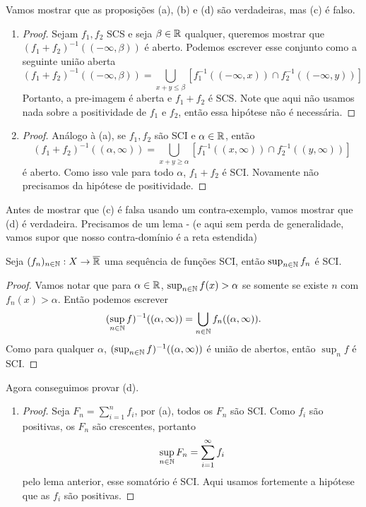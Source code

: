 Vamos mostrar que as proposições (a), (b) e (d) são verdadeiras, mas (c) é falso.
\begin{enumerate}[label=(\alph*)]
    \item \begin{proof}
        Sejam $f_1, f_2$ SCS e seja $\beta \in \mathbb{R}$ qualquer, queremos mostrar que $(f_1 + f_2)^{-1}((-\infty, \beta))$ é aberto.
        Podemos escrever esse conjunto como a seguinte união aberta
        $$(f_1 + f_2)^{-1}((-\infty, \beta)) = \bigcup_{x + y \leq \beta} [f_1^{-1}((-\infty, x)) \cap f_2^{-1}((-\infty, y))] $$
        Portanto, a pre-imagem é aberta e $f_1+ f_2$ é SCS. Note que aqui não usamos nada sobre a positividade de $f_1$ e $f_2$, então essa hipótese não é necessária.
    \end{proof}
    \item \begin{proof}
        Análogo à (a), se $f_1,f_2$ são SCI e $\alpha \in \mathbb{R}$, então 
        $$(f_1 + f_2)^{-1}((\alpha, \infty)) = \bigcup_{x + y \geq \alpha} [f_1^{-1}((x,\infty)) \cap f_2^{-1}((y,\infty))]$$
        é aberto. Como isso vale para todo $\alpha$, $f_1 + f_2$ é SCI. Novamente não precisamos da hipótese de positividade.
    \end{proof}
\end{enumerate}
Antes de mostrar que (c) é falsa usando um contra-exemplo, vamos mostrar que (d) é verdadeira. Precisamos de um lema - (e aqui sem perda de generalidade, 
vamos supor que nosso contra-domínio é a reta estendida)
\begin{lemma}
    Seja $(f_n)_{n \in \mathbb{N}}: X \rightarrow \overline{\mathbb{R}}$ uma sequência de funções SCI, então $\sup_{n \in \mathbb{N}} f_n$ é SCI.
\end{lemma}
\begin{proof}
    Vamos notar que para $\alpha \in \mathbb{R}$, $\sup_{n \in \mathbb{N}} f (x) > \alpha$ se somente se existe $n$ com $f_n(x) > \alpha$. Então podemos escrever
    $$(\sup_{n \in \mathbb{N}} f)^{-1}((\alpha, \infty)) = \bigcup_{n \in \mathbb{N}} f_n((\alpha, \infty)).$$
    Como para qualquer $\alpha$, $(\sup_{n \in \mathbb{N}} f)^{-1}((\alpha, \infty))$ é união de abertos, então $\sup_n f$ é SCI.
\end{proof}
Agora conseguimos provar (d).
\begin{enumerate}[label=(\alph*)]
    \addtocounter{enumi}{3}
    \item \begin{proof}
        Seja $F_n = \sum_{i=1}^{n} f_i$, por (a), todos os $F_n$ são SCI. Como $f_i$ são positivas, os $F_n$ são crescentes, portanto
        $$\sup_{n \in \mathbb{N}} F_n = \sum_{i=1}^{\infty} f_i$$
        pelo lema anterior, esse somatório é SCI. Aqui usamos fortemente a hipótese que as $f_i$ são positivas.
    \end{proof}
\end{enumerate}
